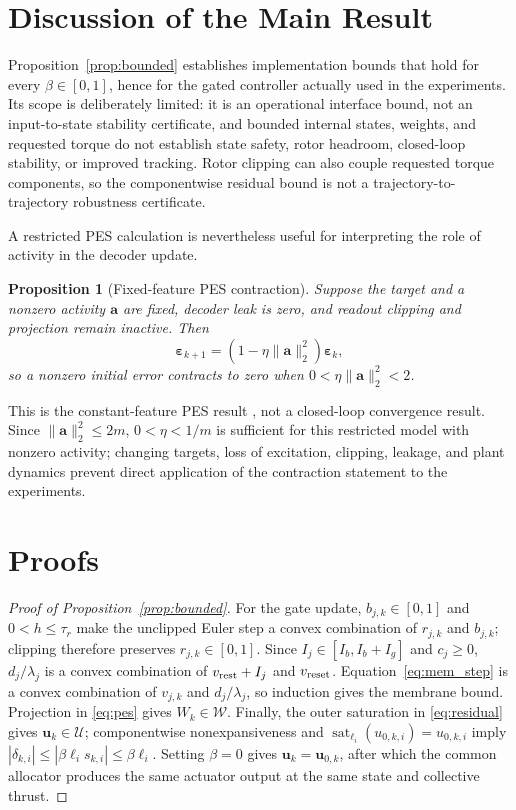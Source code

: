 \documentclass[letterpaper, 10 pt, conference]{ieeeconf}
\newcommand{\sat}{\operatorname{sat}}
\newtheorem{proposition}{Proposition}
\begin{document}
\section{Discussion of the Main Result}
\label{sec:discussion}
Proposition~\ref{prop:bounded} establishes implementation bounds that hold for every $\beta\in[0,1]$, hence for the gated controller actually used in the experiments. Its scope is deliberately limited: it is an operational interface bound, not an input-to-state stability certificate, and bounded internal states, weights, and requested torque do not establish state safety, rotor headroom, closed-loop stability, or improved tracking. Rotor clipping can also couple requested torque components, so the componentwise residual bound is not a trajectory-to-trajectory robustness certificate.

A restricted PES calculation is nevertheless useful for interpreting the role of activity in the decoder update.
\begin{proposition}[Fixed-feature PES contraction]\label{prop:pes}
Suppose the target and a nonzero activity $\bm a$ are fixed, decoder leak is zero, and readout clipping and projection remain inactive. Then
\begin{equation}
 \bm\varepsilon_{k+1}=(1-\eta\|\bm a\|_2^2)\bm\varepsilon_k,
 \label{eq:contraction}
\end{equation}
so a nonzero initial error contracts to zero when $0<\eta\|\bm a\|_2^2<2$.
\end{proposition}
This is the constant-feature PES result \cite{voelker2015pes}, not a closed-loop convergence result. Since $\|\bm a\|_2^2\le 2m$, $0<\eta<1/m$ is sufficient for this restricted model with nonzero activity; changing targets, loss of excitation, clipping, leakage, and plant dynamics prevent direct application of the contraction statement to the experiments.

\section{Proofs}
\label{sec:proofs}
\begin{proof}[Proof of Proposition~\ref{prop:bounded}]
For the gate update, $b_{j,k}\in[0,1]$ and $0<h\le\tau_r$ make the unclipped Euler step a convex combination of $r_{j,k}$ and $b_{j,k}$; clipping therefore preserves $r_{j,k}\in[0,1]$. Since $I_j\in[I_b,I_b+I_g]$ and $c_j\ge0$, $d_j/\lambda_j$ is a convex combination of $v_{\rm rest}+I_j$ and $v_{\rm reset}$. Equation~\eqref{eq:mem_step} is a convex combination of $v_{j,k}$ and $d_j/\lambda_j$, so induction gives the membrane bound. Projection in \eqref{eq:pes} gives $W_k\in\mathcal W$. Finally, the outer saturation in \eqref{eq:residual} gives $\bm u_k\in\mathcal U$; componentwise nonexpansiveness and $\sat_{\ell_i}(u_{0,k,i})=u_{0,k,i}$ imply $|\delta_{k,i}|\le|\beta\ell_i s_{k,i}|\le\beta\ell_i$. Setting $\beta=0$ gives $\bm u_k=\bm u_{0,k}$, after which the common allocator produces the same actuator output at the same state and collective thrust.
\end{proof}
\end{document}
